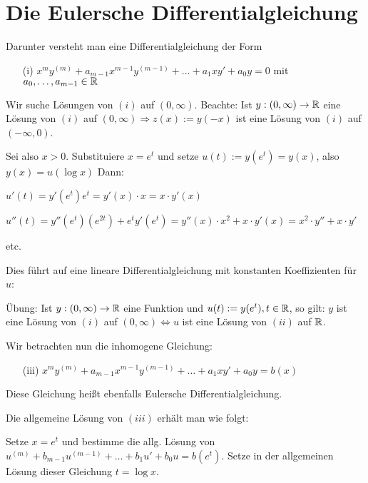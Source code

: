 \documentclass[a4paper,twoside,DIV15,BCOR12mm]{scrbook}
\begin{document}
\chapter{Die Eulersche Differentialgleichung}



Darunter versteht man eine Differentialgleichung der Form

\begin{itemize}
	\item [(i)] $x^m y^{(m)} + a_{m-1} x^{m-1} y^{(m-1)} + \dots + a_1 x y' + a_0 y = 0$ mit $a_0, \dots, a_{m-1} \in \mathbb{R}$
\end{itemize}

Wir suche Lösungen von $(i)$ auf $(0, \infty)$. Beachte: Ist $y: (0, \infty) \to \mathbb{R}$ eine Lösung von $(i)$ auf $(0, \infty) \Rightarrow z(x) := y(-x)$ ist eine Lösung von $(i)$ auf $(-\infty, 0)$.


\begin{satz}[Lösungsansatz] %
	Sei also $x>0$. Substituiere $x = e^t$ und setze $u(t):=y(e^t) = y(x)$, also $y(x) = u( \log x)$
	Dann: 
	
	$u'(t) = y'(e^t)e^t = y'(x) \cdot x = x \cdot y'(x)$
	
	$u''(t) = y''(e^t)(e^{2t}) + e^t y'(e^t) = y''(x) \cdot x^2 + x \cdot y'(x) = x^2 \cdot y'' + x \cdot y'$
	
	etc. 
	
	Dies führt auf eine lineare Differentialgleichung mit konstanten Koeffizienten für $u$:
	
	Übung: Ist $y: (0,\infty) \to \mathbb{R}$ eine Funktion und $u(t):=y(e^t), t \in \mathbb{R}$, so gilt: $y$ ist eine Lösung von $(i)$ auf $(0, \infty) \Leftrightarrow u$ ist eine Lösung von $(ii)$ auf $\mathbb{R}$.
	
	Wir betrachten nun die inhomogene Gleichung:
	
\begin{itemize}
	\item [(iii)] $x^m y^{(m)} + a_{m-1} x^{m-1} y^{(m-1)} + \dots + a_1 x y' + a_0 y = b(x)$
\end{itemize}
	Diese Gleichung heißt ebenfalls Eulersche Differentialgleichung.
	
	Die allgemeine Lösung von $(iii)$ erhält man wie folgt:
	
	Setze $x= e^t$ und bestimme die allg. Lösung von $u^{(m)} + b_{m-1}u^{(m-1)} + \dots + b_1 u' + b_0 u = b(e^t)$. Setze in der allgemeinen Lösung dieser Gleichung $t = \log x.$
\end{satz}	
\end{document}
